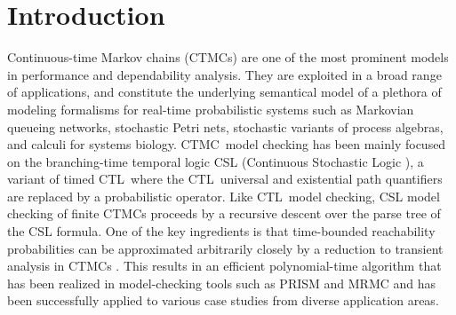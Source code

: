 \documentclass{LMCS}
\newcommand{\<}{\langle}
\renewcommand{\>}{\rangle}
\newcommand{\CTL}{\textsc{CTL}}
\newcommand{\CTMC}{\textsc{{CTMC}}}
\begin{document}
\maketitle
\vfill


\section{Introduction}

Continuous-time Markov chains (\CTMC s) are one of the most prominent models
in performance and dependability analysis.
They are exploited in a broad range of applications, and constitute the underlying
semantical model of a plethora of modeling formalisms for real-time probabilistic
systems such as Markovian queueing networks, stochastic Petri nets, stochastic
variants of process algebras, and calculi for systems biology.
\CTMC\ model checking has been mainly focused on the branching-time temporal
logic CSL (Continuous Stochastic Logic \cite{ASSB00,BHHK03}), a variant of timed
\CTL\ where the \CTL\ universal and existential path quantifiers are replaced by a
probabilistic operator.
Like \CTL\ model checking, CSL model checking of finite CTMCs proceeds by a
recursive descent over the parse tree of the CSL formula.
One of the key ingredients is that time-bounded reachability probabilities can be
approximated arbitrarily closely by a reduction to transient analysis in \CTMC s
\cite{BHHK03}.
This results in an efficient polynomial-time algorithm that has been realized in
model-checking tools such as PRISM \cite{HKNP06} and MRMC \cite{KHHJZ09} and
has been successfully applied to various case studies from diverse application areas.
\end{document}
